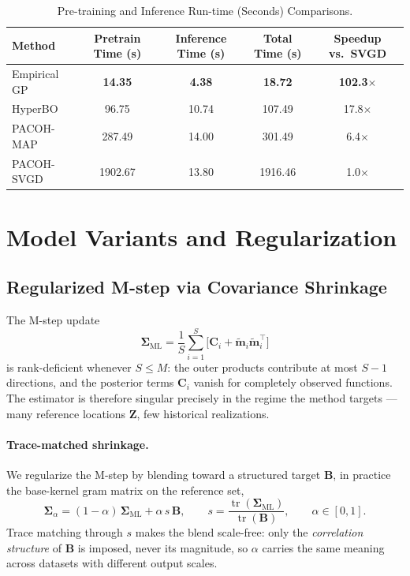 \documentclass{article}
\newcommand{\K}{S}
\newcommand{\bZ}{\mathbf{Z}}
\begin{document}
\begin{table}[ht]
\centering
\small
\caption{Pre-training and Inference Run-time (Seconds) Comparisons.}
\label{tab:app_runtime}
\begin{tabular}{lcccc}
\toprule
Method & Pretrain Time (s) & Inference Time (s) & Total Time (s) & Speedup vs.\ SVGD \\
\midrule
Empirical GP & \textbf{14.35} & \textbf{4.38} & \textbf{18.72} & \textbf{102.3$\times$} \\
HyperBO & 96.75 & 10.74 & 107.49 & 17.8$\times$ \\
PACOH-MAP & 287.49 & 14.00 & 301.49 & 6.4$\times$ \\
PACOH-SVGD & 1902.67 & 13.80 & 1916.46 & 1.0$\times$ \\
\bottomrule
\end{tabular}
\end{table}



\section{Model Variants and Regularization}
\label{apd:variants}

\subsection{Regularized M-step via Covariance Shrinkage}
\label{apd:shrinkage}

The M-step update
\begin{equation}
\label{eq:sigma_ml}
    \boldsymbol{\Sigma}_{\text{ML}}
    = \frac{1}{\K}\sum_{i=1}^{\K}\Big[\mathbf{C}_i
      + \mathbf{\tilde m}_i \mathbf{\tilde m}_i^{\!\top}\Big]
\end{equation}
is rank-deficient whenever $\K \le M$: the outer products contribute at most $\K-1$ directions, and the posterior terms $\mathbf{C}_i$ vanish for completely observed functions. The estimator is therefore singular precisely in the regime the method targets --- many reference locations $\bZ$, few historical realizations.

\paragraph{Trace-matched shrinkage.}
We regularize the M-step by blending toward a structured target $\mathbf{B}$, in practice the base-kernel gram matrix on the reference set,
\begin{equation}
\label{eq:shrinkage}
    \boldsymbol{\Sigma}_\alpha = (1-\alpha)\,\boldsymbol{\Sigma}_{\text{ML}} + \alpha\, s\, \mathbf{B},
    \qquad
    s = \frac{\operatorname{tr}(\boldsymbol{\Sigma}_{\text{ML}})}{\operatorname{tr}(\mathbf{B})},
    \qquad \alpha \in [0,1].
\end{equation}
Trace matching through $s$ makes the blend scale-free: only the \emph{correlation structure} of $\mathbf{B}$ is imposed, never its magnitude, so $\alpha$ carries the same meaning across datasets with different output scales.
\end{document}
